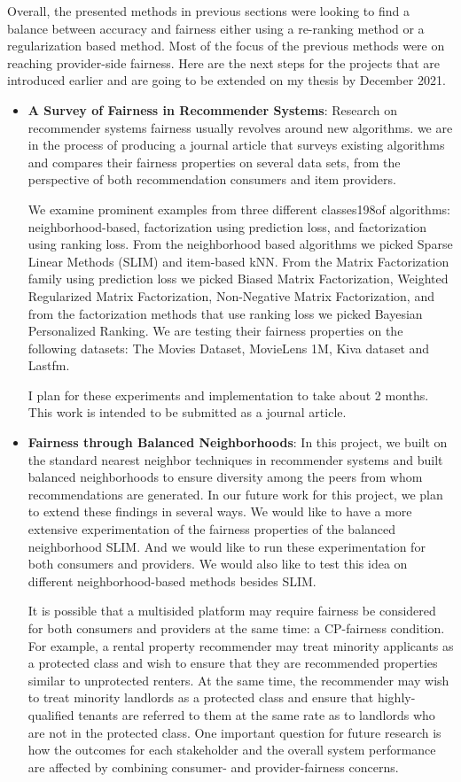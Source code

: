 Overall, the presented methods in previous sections were looking to find a balance between accuracy and fairness either using a re-ranking method or a regularization based method. Most of the focus of the previous methods were on reaching provider-side fairness. 
Here are the next steps for the projects that are introduced earlier and are going to be extended on my thesis by December 2021. 
\begin{itemize}
    \item \textbf{A Survey of Fairness in Recommender Systems}: Research on recommender systems fairness usually revolves around new algorithms. we are in the process of producing a journal article that surveys existing algorithms and compares their fairness properties on several data sets, from the perspective of both recommendation consumers and item providers. 

    We examine prominent examples from three different classes198of algorithms:  neighborhood-based, factorization using prediction loss, and factorization using ranking loss. From the neighborhood based algorithms we picked Sparse Linear Methods (SLIM) and item-based kNN. From the Matrix Factorization family using prediction loss we picked Biased Matrix Factorization, Weighted Regularized Matrix Factorization, Non-Negative Matrix Factorization, and from the factorization methods that use ranking loss we picked Bayesian Personalized Ranking. We are testing their fairness properties on the following datasets: The Movies Dataset, MovieLens 1M, Kiva dataset and Lastfm.
    
    I plan for these experiments and implementation to take about 2 months. This work is intended to be submitted as a journal article.
    
    \item \textbf{Fairness through Balanced Neighborhoods}: In this project, we built on the standard nearest neighbor techniques in recommender systems and built balanced neighborhoods to ensure diversity among the peers from whom recommendations are generated. In our future work for this project, we plan to extend these findings in several ways. We would like to have a more extensive experimentation of the fairness properties of the balanced neighborhood SLIM. And we would like to run these experimentation for both consumers and providers. We would also like to test this idea on different neighborhood-based methods besides SLIM. 
    
    It is possible that a multisided platform may require fairness be considered for both consumers and providers at the same time: a CP-fairness condition. For example, a rental property recommender may treat minority applicants as a protected class and wish to ensure that they are recommended properties similar to unprotected renters. At the same time, the recommender may wish to treat minority landlords as a protected class and ensure that highly-qualified tenants are referred to them at the same rate as to landlords who are not in the protected class. One important question for future research is how the outcomes for each stakeholder and the overall system performance are affected by combining consumer- and provider-fairness concerns.
    

\end{itemize}
